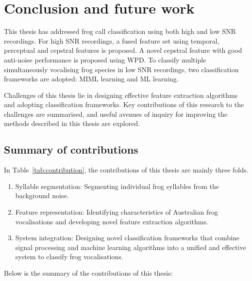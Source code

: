 
\chapter[Conclusion]{Conclusion and future work}
\label{cha:cha8Conclusions}

This thesis has addressed frog call classification using both high and low SNR recordings. For high SNR recordings, a fused feature set using temporal, perceptual and cepstral features is proposed. A novel cepstral feature with good anti-noise performance is proposed using WPD. 
To classify multiple simultaneously vocalising frog species in low SNR recordings, two classification frameworks are adopted: MIML learning and ML learning. 

Challenges of this thesis lie in designing effective feature extraction algorithms and adopting classification frameworks. Key contributions of this research to the challenges are summarised, and useful avenues of inquiry for improving the methods described in this thesis are explored.

\section{Summary of contributions}
	
In Table~\ref{tab:contribution}, the contributions of this thesis are mainly three folds.

\begin{enumerate}
\item Syllable segmentation: Segmenting individual frog syllables from the background noise.

\item Feature representation: Identifying characteristics of Australian frog vocalisations and developing novel feature extraction algorithms.

\item System integration: Designing novel classification frameworks that combine signal processing and machine learning algorithms into a unified and effective system to classify frog vocalisations.

\end{enumerate}

Below is the summary of the contributions of this thesis:

	
